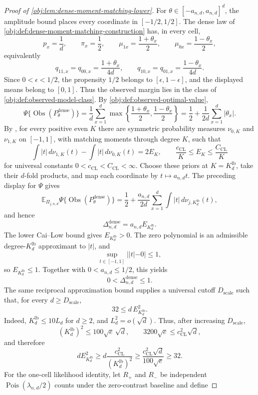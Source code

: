 \begin{proof}[Proof of \cref{obj:lem:dense-moment-matching-lower}]
For \(\theta\in[-a_{n,d},a_{n,d}]^d\), the amplitude bound places every coordinate in \([-1/2,1/2]\). The dense law of \cref{obj:def:dense-moment-matching-construction} has, in every cell,
\[
p_x=\frac1d,\qquad
\pi_x=\frac12,\qquad
\mu_{1x}=\frac{1+\theta_x}{2},\qquad
\mu_{0x}=\frac{1-\theta_x}{2},
\]
equivalently
\[
q_{11,x}=q_{00,x}=\frac{1+\theta_x}{4d},
\qquad
q_{10,x}=q_{01,x}=\frac{1-\theta_x}{4d}.
\]
Since \(0<\epsilon<1/2\), the propensity \(1/2\) belongs to \([\epsilon,1-\epsilon]\), and the displayed means belong to \([0,1]\). Thus the observed margin lies in the class of \cref{obj:def:observed-model-class}. By \cref{obj:def:observed-optimal-value},
\[
\Psi\{\operatorname{Obs}(P_\theta^{\mathrm{dense}})\}
=
\frac1d\sum_{x=1}^d
\max\left\{\frac{1+\theta_x}{2},\frac{1-\theta_x}{2}\right\}
=
\frac12+\frac1{2d}\sum_{x=1}^d|\theta_x|.
\]
By \citep[Lemma 1 and Section 3.1]{CaiLow2011L1}, for every positive even \(K\) there are symmetric probability measures \(\nu_{0,K}\) and \(\nu_{1,K}\) on \([-1,1]\), with matching moments through degree \(K\), such that
\[
\int |t|\,d\nu_{1,K}(t)-\int |t|\,d\nu_{0,K}(t)=2E_K,
\qquad
\frac{c_{\mathrm{CL}}}{K}\le E_K\le \frac{C_{\mathrm{CL}}}{K}
\]
for universal constants \(0<c_{\mathrm{CL}}<C_{\mathrm{CL}}<\infty\). Choose these priors at \(K=K_d^{\mathrm{lb}}\), take their \(d\)-fold products, and map each coordinate by \(t\mapsto a_{n,d}t\). The preceding display for \(\Psi\) gives
\[
\mathbb E_{\Pi_{j,n,d}}\Psi\{\operatorname{Obs}(P_\theta^{\mathrm{dense}})\}
=
\frac12+\frac{a_{n,d}}{2d}
\sum_{x=1}^d\int |t|\,d\nu_{j,K_d^{\mathrm{lb}}}(t),
\]
and hence
\[
\Delta_{n,d}^{\mathrm{dense}}
=
a_{n,d}E_{K_d^{\mathrm{lb}}}.
\]
The lower Cai--Low bound gives \(E_{K_d^{\mathrm{lb}}}>0\). The zero polynomial is an admissible degree-\(K_d^{\mathrm{lb}}\) approximant to \(|t|\), and
\[
\sup_{t\in[-1,1]}||t|-0|\le1,
\]
so \(E_{K_d^{\mathrm{lb}}}\le1\). Together with \(0<a_{n,d}\le1/2\), this yields
\[
0<\Delta_{n,d}^{\mathrm{dense}}\le1.
\]
The same reciprocal approximation bound supplies a universal cutoff \(D_{\mathrm{scale}}\) such that, for every \(d\ge D_{\mathrm{scale}}\),
\[
32\le d\,E_{K_d^{\mathrm{lb}}}^{2}.
\]
Indeed, \(K_d^{\mathrm{lb}}\le10L_d\) for \(d\ge2\), and \(L_d^2=o(\sqrt d)\). Thus, after increasing \(D_{\mathrm{scale}}\),
\[
(K_d^{\mathrm{lb}})^2\le 100\sqrt e\,\sqrt d,
\qquad
3200\sqrt e\le c_{\mathrm{CL}}^2\sqrt d,
\]
and therefore
\[
dE_{K_d^{\mathrm{lb}}}^2
\ge
d\frac{c_{\mathrm{CL}}^2}{(K_d^{\mathrm{lb}})^2}
\ge
\frac{c_{\mathrm{CL}}^2\sqrt d}{100\sqrt e}
\ge32.
\]
For the one-cell likelihood identity, let \(R_+\) and \(R_-\) be independent \(\operatorname{Pois}(\lambda_{n,d}/2)\) counts under the zero-contrast baseline and define

\end{proof}
